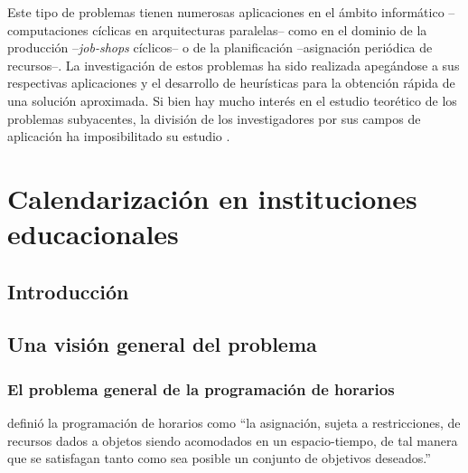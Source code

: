 \documentclass[spanish,draft,12pt,headsepline,footsepline,paper=letter]{scrreprt}
\begin{document}
Este tipo de problemas tienen numerosas aplicaciones en el ámbito informático –computaciones cíclicas en arquitecturas paralelas– como en el dominio de la producción –\textit{job-shops} cíclicos– o de la planificación –asignación periódica de recursos–. La investigación de estos problemas ha sido realizada apegándose a sus respectivas aplicaciones y el desarrollo de heurísticas para la obtención rápida de una solución aproximada. Si bien hay mucho interés en el estudio teorético de los problemas subyacentes, la división de los investigadores por sus campos de aplicación ha imposibilitado su estudio \citep[p.~131]{gotha93les-problemes-dordonnancement}.

\chapter{Calendarización en instituciones educacionales}

\section{Introducción}
\label{introduccion_vision_general}

%
\section{Una visión general del problema}
\label{vision_general_problema}

\subsection{El problema general de la programación de horarios}
\label{problema_general_programacion_horarios}

\citet[p.~53]{wren95scheduling-timetabling} definió la programación de horarios como “la asignación, sujeta a restricciones, de recursos dados a objetos siendo acomodados en un espacio-tiempo, de tal manera que se satisfagan tanto como sea posible un conjunto de objetivos deseados.”
\end{document}
